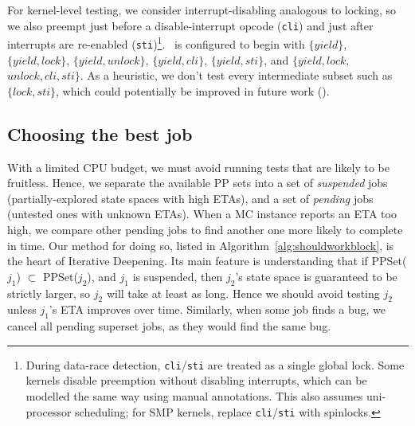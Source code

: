 For kernel-level testing, we consider interrupt-disabling analogous to locking,
so we also preempt just before a disable-interrupt opcode ({\tt cli}) and just after interrupts are re-enabled ({\tt sti})\footnote{
During data-race detection, {\tt cli}/{\tt sti} are treated as a single global lock.
Some kernels disable preemption without disabling interrupts,
which can be modelled the same way using manual annotations. %
This also assumes uni-processor scheduling; for SMP kernels, replace {\tt cli}/{\tt sti} with spinlocks.}.
\quicksand~is configured to begin with
$\{yield\}$,
$\{yield,lock\}$,
$\{yield,unlock\}$,
$\{yield,cli\}$,
$\{yield,sti\}$,
and $\{yield,lock,$ $unlock,cli,sti\}$.
As a heuristic, we don't test every intermediate subset such as $\{lock,sti\}$,
which could potentially be improved in future work (\sect{\ref{sec:future}}).


\subsection{Choosing the best job}


\newcommand\PendingJobs{\ensuremath{\mathcal{P}}}
\newcommand\SuspendedJobs{\ensuremath{\mathcal{S}}}
\newcommand\GetETA[1]{ETA(#1)}
\newcommand\GetPPSet[1]{PPSet(#1)}
With a limited CPU budget, we must avoid running tests that are likely to be fruitless.
Hence, we separate the available PP sets into a set of {\em suspended} jobs (partially-explored state spaces with high ETAs),
and a set of {\em pending} jobs (untested ones with unknown ETAs).
When a MC instance reports an ETA too high,
we compare other pending jobs to find another one more likely to complete in time.
%
Our method for doing so, listed in Algorithm~\ref{alg:shouldworkblock}, is the heart of Iterative Deepening.
Its main feature is understanding that if \GetPPSet{$j_1$} $\subset$ \GetPPSet{$j_2$},
and $j_1$ is suspended,
then $j_2$'s state space is guaranteed to be strictly larger, so $j_2$ will take at least as long.
Hence we should avoid testing $j_2$ unless $j_1$'s ETA improves over time.
Similarly, when some job finds a bug, we cancel all pending superset jobs, as they would find the same bug.

